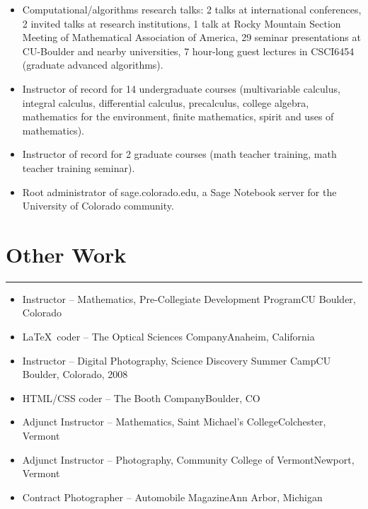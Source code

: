 \documentclass[letterpaper,10pt]{article}
\newcommand{\mblue}{\color{darkblue}}
\begin{document}
\begin{itemize}
\item Computational/algorithms research talks: 2 talks at international conferences, 2 invited talks
at research institutions, 1 talk at Rocky Mountain Section Meeting of Mathematical Association of
America, 29 seminar presentations at CU-Boulder and nearby universities, 7 hour-long guest lectures
in CSCI6454 (graduate advanced algorithms).

\item Instructor of record for 14 undergraduate courses (multivariable calculus,
integral calculus, differential calculus, precalculus, college algebra, mathematics for the
environment, finite mathematics, spirit and uses of mathematics).

\item Instructor of record for 2
graduate courses (math teacher training, math teacher training seminar).

\item Root administrator
of sage.colorado.edu, a Sage Notebook server for the University of Colorado community.
\end{itemize} 


\section*{\mblue Other Work}

\vspace{-2.15pc}
{\hfill\mblue\rule{5.7in}{0.02cm}}

\vspace{1pc}
\begin{itemize}
\item Instructor -- Mathematics, Pre-Collegiate Development Program\hfill CU Boulder, Colorado
\item \LaTeX\ coder -- The Optical Sciences Company\hfill Anaheim, California
\item Instructor -- Digital Photography, Science Discovery Summer Camp\hfill CU Boulder,
Colorado, 2008
\item HTML/CSS coder -- The Booth Company\hfill Boulder, CO
\item Adjunct Instructor -- Mathematics, Saint Michael's College\hfill Colchester, Vermont
\item Adjunct Instructor -- Photography, Community College of Vermont\hfill Newport, Vermont
\item Contract Photographer -- Automobile Magazine\hfill Ann Arbor, Michigan
\end{itemize}
\end{document}
